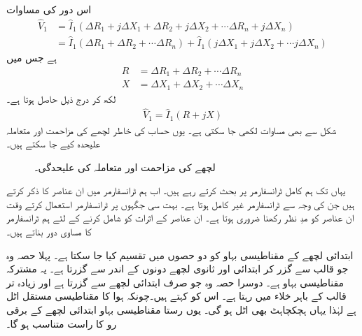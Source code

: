 اس دور کی مساوات 
\begin{align*}
\hat{V}_1&=\hat{I}_1 \left(\Delta R_1 + j \Delta X_1 +\Delta R_2 + j \Delta X_2 + \cdots \Delta R_n + j \Delta X_n   \right)\\
&=\hat{I}_1 \left(\Delta R_1 +\Delta R_2 +\cdots \Delta R_n   \right)+\hat{I}_1 \left(j \Delta X_1 + j \Delta X_2+\cdots   j \Delta X_n   \right)
\end{align*}
ہے جس میں
\begin{align*}
R&=\Delta R_1 +\Delta R_2 +\cdots \Delta R_n\\
X&=\Delta X_1 + \Delta X_2 +\cdots   \Delta X_n
\end{align*}
لکھ کر درج ذیل حاصل ہوتا ہے۔
\begin{align}\label{مساوات_ٹرانسفارمر_مزاحمت_علیحدہ}
\hat{V}_1=\hat{I}_1 \left( R +j X \right)
\end{align}
شکل   سے بھی مساوات  لکھی جا سکتی ہے۔ یوں حساب کی خاطر  لچھے کی مزاحمت اور متعاملہ  علیحدہ کیے جا سکتے ہیں۔
\begin{figure}
\centering
\caption{لچھے کی مزاحمت اور متعاملہ کی علیحدگی۔}
\label{شکل_ٹرانسفارمر_لچھے_کی_مزاحمت_اور_متعاملہ_کی_علیحدگی}
\end{figure}
%
یہاں تک ہم  کامل ٹرانسفارمر پر بحث کرتے رہے ہیں۔ اب ہم ٹرانسفارمر میں ان عناصر کا ذکر کرتے ہیں جن کی وجہ سے ٹرانسفارمر غیر کامل ہوتا ہے۔ بہت سی جگہوں پر ٹرانسفارمر استعمال کرتے وقت ان عناصر کو مدِ نظر رکھنا ضروری ہوتا ہے۔ ان عناصر کے اثرات کو شامل کرنے کے لئے ہم  ٹرانسفارمر کا مساوی دور بناتے ہیں۔

ابتدائی لچھے کے مقناطیسی بہاو کو دو حصوں میں تقسیم کیا جا سکتا ہے۔ پہلا حصہ وہ جو قالب سے گزر کر ابتدائی اور ثانوی لچھے دونوں کے اندر سے گزرتا ہے۔ یہ مشترکہ مقناطیسی بہاو ہے۔ دوسرا حصہ وہ جو صرف ابتدائی لچھے سے گزرتا ہے اور زیادہ تر قالب کے باہر خلاء میں رہتا ہے۔  اس کو    کہتے ہیں۔چونکہ ہوا کا مقناطیسی مستقل  اٹل ہے لہٰذا یہاں ہچکچاہٹ بھی اٹل ہو گی۔  یوں رستا مقناطیسی بہاو ابتدائی لچھے کے برقی رو کا  راست متناسب ہو گا۔

